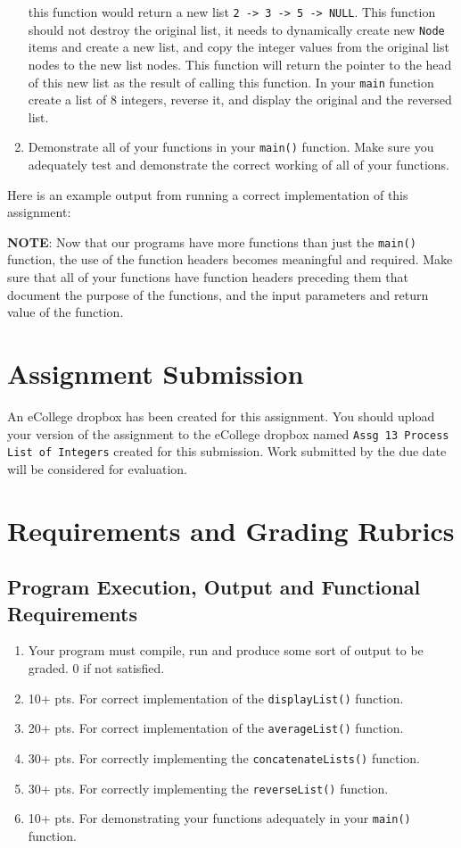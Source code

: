 \documentclass[11pt]{article}
\begin{document}
\begin{enumerate}
   this function would return a new list \verb~2 -> 3 -> 5 -> NULL~.  This
   function should not destroy the original list, it needs to dynamically
   create new \verb~Node~ items and create a new list, and copy the
   integer values from the original list nodes to the new list
   nodes.  This function will return the pointer to the head of this
   new list as the result of calling this function.  In your \verb~main~
   function create a list of 8 integers, reverse it, and display
   the original and the reversed list.
\item Demonstrate all of your functions in your \verb~main()~ function.  Make
   sure you adequately test and demonstrate the correct working of all
   of your functions.
\end{enumerate}


Here is an example output from running a correct implementation of
this assignment:


\textbf{NOTE}: Now that our programs have more functions than just the
\verb~main()~ function, the use of the function headers becomes meaningful
and required.  Make sure that all of your functions have function
headers preceding them that document the purpose of the functions, and
the input parameters and return value of the function.
\section*{Assignment Submission}
\label{sec-4}


An eCollege dropbox has been created for this assignment.  You should
upload your version of the assignment to the eCollege dropbox named
\verb~Assg 13 Process List of Integers~ created for this submission.  Work
submitted by the due date will be considered for evaluation.
\section*{Requirements and Grading Rubrics}
\label{sec-5}
\subsection*{Program Execution, Output and Functional Requirements}
\label{sec-5-1}


\begin{enumerate}
\item Your program must compile, run and produce some sort of output to
   be graded. 0 if not satisfied.
\item 10+ pts. For correct implementation of the \verb~displayList()~ function.
\item 20+ pts. For correct implementation of the \verb~averageList()~ function.
\item 30+ pts. For correctly implementing the \verb~concatenateLists()~ function.
\item 30+ pts. For correctly implementing the \verb~reverseList()~ function.
\item 10+ pts. For demonstrating your functions adequately in your \verb~main()~ function.
\end{enumerate}
\end{document}
